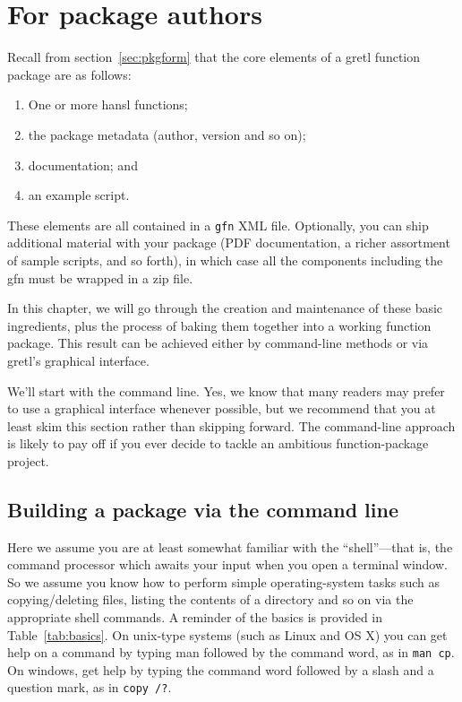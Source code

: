\documentclass[oneside]{book}
\begin{document}

\chapter{For package authors}
\label{chap:authors}

Recall from section~\ref{sec:pkgform} that the core elements
of a gretl function package are as follows:
\begin{enumerate}
\item One or more hansl functions;
\item the package metadata (author, version and so on);
\item documentation; and
\item an example script.
\end{enumerate}
These elements are all contained in a \texttt{gfn} XML file.
Optionally, you can ship additional material with your package (PDF
documentation, a richer assortment of sample scripts, and so forth),
in which case all the components including the \textsf{gfn} must be
wrapped in a zip file.

In this chapter, we will go through the creation and maintenance of
these basic ingredients, plus the process of baking them together into
a working function package. This result can be achieved either by
command-line methods or via gretl's graphical interface.

We'll start with the command line. Yes, we know that many readers may
prefer to use a graphical interface whenever possible, but we
recommend that you at least skim this section rather than skipping
forward.  The command-line approach is likely to pay off if you ever
decide to tackle an ambitious function-package project.


\section{Building a package via the command line}
\label{sec:cli-build}

Here we assume you are at least somewhat familiar with the
``shell''---that is, the command processor which awaits your input
when you open a terminal window. So we assume you know how to perform
simple operating-system tasks such as copying/deleting files, listing
the contents of a directory and so on via the appropriate shell
commands. A reminder of the basics is provided in
Table~\ref{tab:basics}. On unix-type systems (such as Linux and OS X)
you can get help on a command by typing man followed by the command
word, as in \texttt{man cp}. On windows, get help by typing the
command word followed by a slash and a question mark, as in
\texttt{copy /?}.
\end{document}
